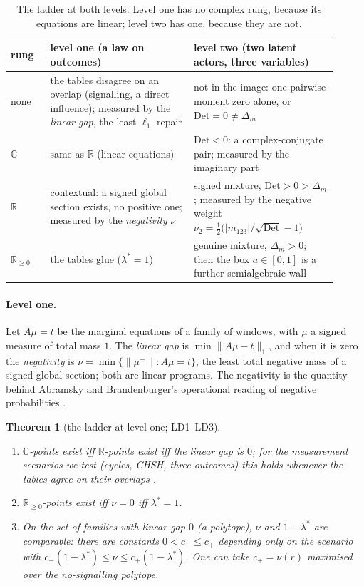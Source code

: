 \documentclass[11pt]{article}
\newtheorem{theorem}{Theorem}\newtheorem{proposition}[theorem]{Proposition}\newtheorem{corollary}[theorem]{Corollary}
\theoremstyle{definition}\newtheorem{definition}[theorem]{Definition}\newtheorem{remark}[theorem]{Remark}\newtheorem{example}[theorem]{Example}
\newcommand{\R}{\mathbb R}
\begin{document}
\begin{table}[!htbp]\centering\small
\begin{tabular}{p{0.11\linewidth}p{0.4\linewidth}p{0.4\linewidth}}\toprule
rung & level one (a law on outcomes) & level two (two latent actors, three variables)\\\midrule
none & the tables disagree on an overlap (signalling, a direct influence); measured by the \emph{linear gap}, the least $\ell_1$ repair & not in the image: one pairwise moment zero alone, or $\mathrm{Det}=0\neq\Delta_m$\\
$\mathbb C$ & same as $\R$ (linear equations) & $\mathrm{Det}<0$: a complex-conjugate pair; measured by the imaginary part\\
$\R$ & contextual: a signed global section exists, no positive one; measured by the \emph{negativity} $\nu$ & signed mixture, $\mathrm{Det}>0>\Delta_m$; measured by the negative weight $\nu_2=\tfrac12\big(|m_{123}|/\sqrt{\mathrm{Det}}-1\big)$\\
$\R_{\ge0}$ & the tables glue ($\lambda^*=1$) & genuine mixture, $\Delta_m>0$; then the box $a\in[0,1]$ is a further semialgebraic wall\\\bottomrule
\end{tabular}
\caption{The ladder at both levels. Level one has no complex rung, because its equations are linear; level two has one, because they
are not.}\label{tab:ladder}
\end{table}

\paragraph{Level one.}
Let $A\mu=t$ be the marginal equations of a family of windows, with $\mu$ a signed measure of total mass $1$. The \emph{linear gap} is
$\min\|A\mu-t\|_1$, and when it is zero the \emph{negativity} is $\nu=\min\{\|\mu^-\|:A\mu=t\}$, the least total negative mass of a signed
global section; both are linear programs. The negativity is the quantity behind Abramsky and Brandenburger's operational reading of
negative probabilities \cite{AbramskyBrandenburger2014}.

\begin{theorem}[the ladder at level one; LD1--LD3]\label{thm:ladder1}
\begin{enumerate}[label=(\roman*),leftmargin=*,itemsep=1pt]
\item $\mathbb C$-points exist iff $\R$-points exist iff the linear gap is $0$; for the measurement scenarios we test (cycles, CHSH,
three outcomes) this holds whenever the tables agree on their overlaps \cite{AbramskyBrandenburger2011}.
\item $\R_{\ge0}$-points exist iff $\nu=0$ iff $\lambda^*=1$.
\item On the set of families with linear gap $0$ (a polytope), $\nu$ and $1-\lambda^*$ are comparable: there are constants $0<c_-\le c_+$
depending only on the scenario with $c_-(1-\lambda^*)\le\nu\le c_+(1-\lambda^*)$. One can take $c_+=\nu(r)$ maximised over the
no-signalling polytope.
\end{enumerate}
\end{theorem}
\end{document}

